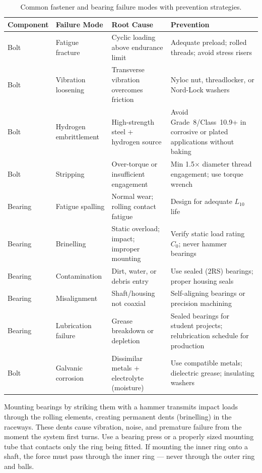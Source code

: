\documentclass[11pt,letterpaper,twoside,openany]{book}
\begin{document}
\begin{table}[ht!]
\centering\small
\begin{tabularx}{\textwidth}{l l X X}
\toprule
\textbf{Component} & \textbf{Failure Mode} & \textbf{Root Cause} & \textbf{Prevention} \\
\midrule
Bolt & Fatigue fracture & Cyclic loading above endurance limit & Adequate preload; rolled threads; avoid stress risers \\
Bolt & Vibration loosening & Transverse vibration overcomes friction & Nyloc nut, threadlocker, or Nord-Lock washers \\
Bolt & Hydrogen embrittlement & High-strength steel + hydrogen source & Avoid Grade~8/Class~10.9+ in corrosive or plated applications without baking \\
Bolt & Stripping & Over-torque or insufficient engagement & Min 1.5$\times$ diameter thread engagement; use torque wrench \\
Bearing & Fatigue spalling & Normal wear; rolling contact fatigue & Design for adequate $L_{10}$ life \\
Bearing & Brinelling & Static overload; impact; improper mounting & Verify static load rating $C_0$; never hammer bearings \\
Bearing & Contamination & Dirt, water, or debris entry & Use sealed (2RS) bearings; proper housing seals \\
Bearing & Misalignment & Shaft/housing not coaxial & Self-aligning bearings or precision machining \\
Bearing & Lubrication failure & Grease breakdown or depletion & Sealed bearings for student projects; relubrication schedule for production \\
Bolt & Galvanic corrosion & Dissimilar metals + electrolyte (moisture) & Use compatible metals; dielectric grease; insulating washers \\
\bottomrule
\end{tabularx}
\caption{Common fastener and bearing failure modes with prevention strategies.}
\end{table}

\begin{warningbox}
Mounting bearings by striking them with a hammer transmits impact loads through the rolling elements, creating permanent dents (brinelling) in the raceways. These dents cause vibration, noise, and premature failure from the moment the system first turns. Use a bearing press or a properly sized mounting tube that contacts only the ring being fitted. If mounting the inner ring onto a shaft, the force must pass through the inner ring --- never through the outer ring and balls.
\end{warningbox}
\end{document}
